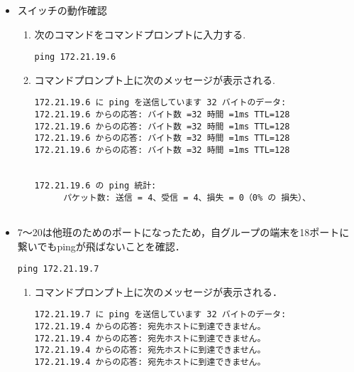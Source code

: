 \documentclass[a4j,titlepage]{jarticle}
\begin{document}
\begin{itemize}
\item スイッチの動作確認

\begin{enumerate}

\item 次のコマンドをコマンドプロンプトに入力する.\\
  \begin{center}
    \begin{screen}
\begin{verbatim}
ping 172.21.19.6
\end{verbatim}
    \end{screen}
  \end{center}
\item コマンドプロンプト上に次のメッセージが表示される.\\
    \begin{center}
    \begin{screen}
\begin{verbatim}
172.21.19.6 に ping を送信しています 32 バイトのデータ:
172.21.19.6 からの応答: バイト数 =32 時間 =1ms TTL=128
172.21.19.6 からの応答: バイト数 =32 時間 =1ms TTL=128
172.21.19.6 からの応答: バイト数 =32 時間 =1ms TTL=128
172.21.19.6 からの応答: バイト数 =32 時間 =1ms TTL=128


172.21.19.6 の ping 統計:
    　パケット数: 送信 = 4、受信 = 4、損失 = 0（0% の 損失）、
    
\end{verbatim}
    \end{screen}
  \end{center}
  
  
  
  
\end{enumerate}

\item 7〜20は他班のためのポートになったため，自グループの端末を18ポートに繋いでもpingが飛ばないことを確認．

\begin{center}
    \begin{screen}
\begin{verbatim}
ping 172.21.19.7
\end{verbatim}
    \end{screen}
  \end{center}
  
\begin{enumerate}

\item コマンドプロンプト上に次のメッセージが表示される．
    \begin{center}
    \begin{screen}
\begin{verbatim}
172.21.19.7 に ping を送信しています 32 バイトのデータ:
172.21.19.4 からの応答: 宛先ホストに到達できません。
172.21.19.4 からの応答: 宛先ホストに到達できません。
172.21.19.4 からの応答: 宛先ホストに到達できません。
172.21.19.4 からの応答: 宛先ホストに到達できません。



\end{verbatim}
\end{screen}
\end{center}
\end{enumerate}
\end{itemize}
\end{document}
